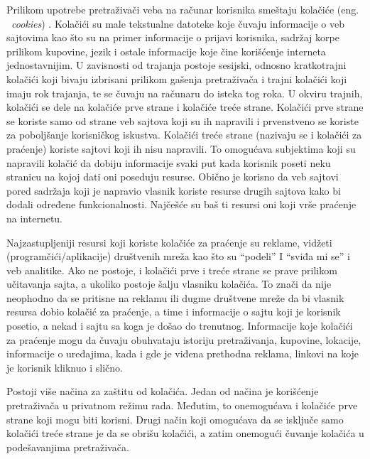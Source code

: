 \documentclass[a4paper]{article}
\begin{document}
Prilikom upotrebe pretraživači veba na računar korisnika smeštaju kolačiće (eng. ~{\em cookies}) \cite{cookies1}. Kolačići su male tekstualne datoteke koje čuvaju informacije o veb sajtovima kao što su na primer informacije o prijavi korisnika, sadržaj korpe prilikom  kupovine, jezik i ostale informacije koje čine korišćenje interneta jednostavnijim. U zavisnosti od trajanja postoje sesijski, odnosno kratkotrajni kolačići koji bivaju izbrisani prilikom gašenja pretraživača i trajni kolačići koji imaju rok trajanja, te se čuvaju na računaru do isteka tog roka. U okviru trajnih, kolačići se dele na kolačiće prve strane i kolačiće treće strane.  Kolačići prve strane se koriste samo od strane veb sajtova koji su ih napravili i prvenstveno se koriste za poboljšanje korisničkog iskustva. Kolačići treće strane (nazivaju se i kolačići za praćenje) koriste  sajtovi koji ih nisu napravili. To omogućava subjektima koji su napravili kolačić da dobiju informacije svaki put kada korisnik poseti neku stranicu na kojoj dati oni poseduju resurse. Obično je korisno da veb sajtovi pored sadržaja koji je napravio vlasnik koriste resurse drugih sajtova kako bi dodali određene  funkcionalnosti. Najčešće su baš ti resursi oni koji vrše praćenje na internetu.
\par Najzastupljeniji resursi koji koriste kolačiće za praćenje su reklame, vidžeti (programčići/aplikacije) društvenih mreža kao što su “podeli” I “sviđa mi se” i veb analitike. Ako ne postoje, i kolačići prve i treće strane se prave prilikom učitavanja sajta, a ukoliko postoje šalju vlasniku kolačića. To znači da nije neophodno da se pritisne na reklamu ili dugme društvene mreže da bi vlasnik resursa dobio kolačić za praćenje, a time i informacije o sajtu koji je korisnik posetio, a nekad i sajtu sa koga je došao do trenutnog. Informacije koje kolačići za praćenje mogu da čuvaju obuhvataju istoriju pretraživanja, kupovine, lokacije, informacije o uređajima, kada i gde je viđena prethodna reklama, linkovi na koje je korisnik kliknuo i slično. 
\par Postoji više načina za zaštitu od kolačića. Jedan od načina je korišćenje pretraživača u privatnom režimu rada. Međutim, to onemogućava i kolačiće prve strane koji mogu biti korisni. Drugi način koji omogućava da se isključe samo kolačići treće strane je da se obrišu kolačići, a zatim onemogući čuvanje kolačića u podešavanjima pretraživača. 
\end{document}
